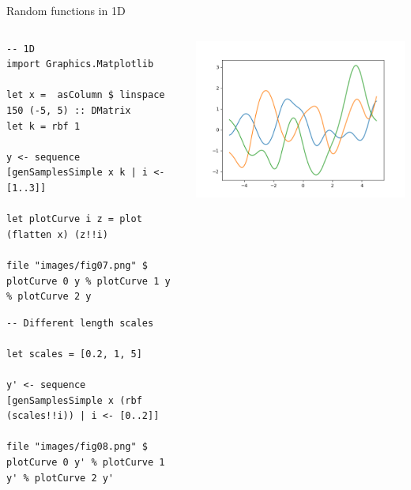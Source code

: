 \documentclass[presentation]{beamer}
\begin{document}
\begin{frame}[fragile,label={sec:orgc07a768}]{Random functions in 1D}
 \begin{columns}
\begin{column}{0.55\columnwidth}
\begin{verbatim}
-- 1D
import Graphics.Matplotlib

let x =  asColumn $ linspace 150 (-5, 5) :: DMatrix
let k = rbf 1

y <- sequence [genSamplesSimple x k | i <- [1..3]]

let plotCurve i z = plot (flatten x) (z!!i)

file "images/fig07.png" $ plotCurve 0 y % plotCurve 1 y % plotCurve 2 y
\end{verbatim}

\begin{verbatim}
-- Different length scales

let scales = [0.2, 1, 5]

y' <- sequence [genSamplesSimple x (rbf (scales!!i)) | i <- [0..2]]

file "images/fig08.png" $ plotCurve 0 y' % plotCurve 1 y' % plotCurve 2 y'
\end{verbatim}
\end{column}

\begin{column}{0.4\columnwidth}
\begin{center}
\includegraphics[width=.9\linewidth]{images/fig07.png}
\end{center}


\end{column}
\end{columns}
\end{frame}
\end{document}
